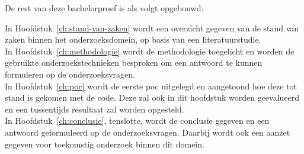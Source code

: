 
De rest van deze bachelorproef is als volgt opgebouwd:

In Hoofdstuk~\ref{ch:stand-van-zaken} wordt een overzicht gegeven van de stand van zaken binnen het onderzoeksdomein, op basis van een literatuurstudie.\\

In Hoofdstuk~\ref{ch:methodologie} wordt de methodologie toegelicht en worden de gebruikte onderzoekstechnieken besproken om een antwoord te kunnen formuleren op de onderzoeksvragen.\\

In Hoofdstuk~\ref{ch:poc} wordt de eerste \gls{poc} uitgelegd en aangetoond hoe deze tot stand is gekomen met de code. Deze zal ook in dit hoofdstuk worden geevalueerd en een tussentijds resultaat zal worden opgesteld.\\

In Hoofdstuk~\ref{ch:conclusie}, tenslotte, wordt de conclusie gegeven en een antwoord geformuleerd op de onderzoeksvragen. Daarbij wordt ook een aanzet gegeven voor toekomstig onderzoek binnen dit domein.
